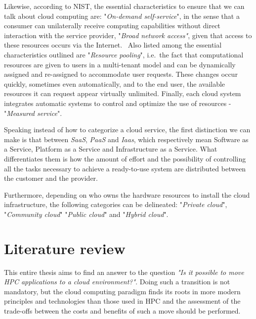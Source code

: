 Likewise, according to NIST, the essential characteristics to ensure that we can
talk about cloud computing are: "\textit{On-demand self-service}",
in the sense that a consumer can unilaterally receive computing capabilities
without direct interaction with the service provider, "\textit{Broad network
  access"}, given that access to these resources occurs via the Internet.
 Also listed among the essential characteristics outlined are "\textit{Resource
  pooling}",
i.e. the fact that computational resources are given to users in a multi-tenant
model and can be dynamically assigned and re-assigned to accommodate user
requests.
These changes occur quickly, sometimes even automatically, and to the end user,
the available resources it can request appear virtually unlimited.
Finally, each cloud system integrates automatic systems to control and optimize
the use of resources - "\textit{Measured service}".

Speaking instead of how to categorize a cloud service, the first distinction we
can make is that between \textit{SaaS}, \textit{PaaS} and \textit{Iaas}, which
respectively mean Software as a Service, Platform as a Service and
Infrastructure as a Service. What differentiates them is how the amount of
effort and the possibility of controlling all the tasks necessary to achieve a
ready-to-use system are distributed between the customer and the provider.

\noindent Furthermore, depending on who owns the hardware resources to install the cloud
infrastructure, the following categories can be delineated: "\textit{Private
  cloud}", "\textit{Community cloud}" "\textit{Public cloud}" and
"\textit{Hybrid cloud}".

\section{Literature review}


This entire thesis aims to find an answer to the question \textit{"Is
  it possible to move HPC applications to a cloud environment?"}.
Doing such a transition is not mandatory, but the cloud computing paradigm finds
its roots in more modern principles and technologies than those used in HPC and
the assessment of the trade-offs between the costs and benefits of such a move
should be performed.


